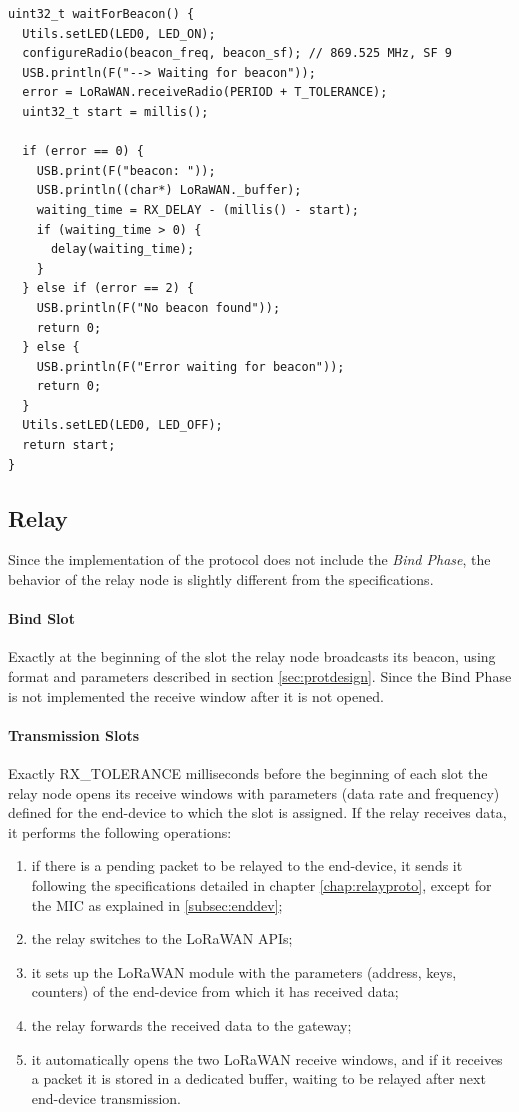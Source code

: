 \begin{lstlisting}[caption=Wait for beacon on the end-device\label{list:waitforbeacon}]
uint32_t waitForBeacon() {
  Utils.setLED(LED0, LED_ON);
  configureRadio(beacon_freq, beacon_sf); // 869.525 MHz, SF 9
  USB.println(F("--> Waiting for beacon"));
  error = LoRaWAN.receiveRadio(PERIOD + T_TOLERANCE);
  uint32_t start = millis();

  if (error == 0) {
    USB.print(F("beacon: "));
    USB.println((char*) LoRaWAN._buffer);
    waiting_time = RX_DELAY - (millis() - start);
    if (waiting_time > 0) {
      delay(waiting_time);
    }
  } else if (error == 2) {
    USB.println(F("No beacon found"));  
    return 0;
  } else {
    USB.println(F("Error waiting for beacon"));
    return 0;
  }
  Utils.setLED(LED0, LED_OFF);
  return start;
}
\end{lstlisting}

\subsection{Relay}

Since the implementation of the protocol does not include the \emph{Bind Phase}, the behavior of the relay node is slightly different from the specifications.

\paragraph{Bind Slot} Exactly at the beginning of the slot the relay node broadcasts its beacon, using format and parameters described in section \ref{sec:protdesign}. Since the Bind Phase is not implemented the receive window after it is not opened.

\paragraph{Transmission Slots} Exactly RX\_TOLERANCE milliseconds before the beginning of each slot the relay node opens its receive windows with parameters (data rate and frequency) defined for the end-device to which the slot is assigned. If the relay receives data, it performs the following operations:

\begin{enumerate}
\item if there is a pending packet to be relayed to the end-device, it sends it following the specifications detailed in chapter \ref{chap:relayproto}, except for the MIC as explained in \ref{subsec:enddev};
\item the relay switches to the LoRaWAN APIs;
\item it sets up the LoRaWAN module with the parameters (address, keys, counters) of the end-device from which it has received data;
\item the relay forwards the received data to the gateway;
\item it automatically opens the two LoRaWAN receive windows, and if it receives a packet it is stored in a dedicated buffer, waiting to be relayed after next end-device transmission.
\end{enumerate}

